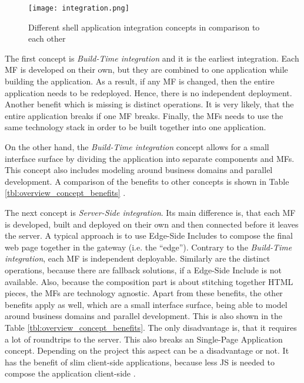 \begin{figure}[h]
    \centering
    \texttt{[image: integration.png]}
    \caption{Different shell application integration concepts in comparison to each other \cite{Leitner.2020}}
    \label{img:container_application_concepts}
\end{figure}

The first concept is \textit{Build-Time integration} and it is the earliest integration.
Each \ac{MF} is developed on their own, but they are combined to one application while building the application.
As a result, if any \ac{MF} is changed, then the entire application needs to be redeployed.
Hence, there is no independent deployment.
Another benefit which is missing is distinct operations.
It is very likely, that the entire application breaks if one \ac{MF} breaks.
Finally, the \acp{MF} needs to use the same technology stack in order to be built together into one application.

On the other hand, the \textit{Build-Time integration} concept allows for a small interface surface by dividing the application into separate components and \acp{MF}.
This concept also includes modeling around business domains and parallel development.
A comparison of the benefits to other concepts is shown in Table \ref{tbl:overview_concept_benefits} \cite{Leitner.2020}.

The next concept is \textit{Server-Side integration}.
Its main difference is, that each \ac{MF} is developed, built and deployed on their own and then connected before it leaves the server.
A typical approach is to use Edge-Side Includes to compose the final web page together in the gateway (i.e. the \enquote{edge}).
Contrary to the \textit{Build-Time integration}, each \ac{MF} is independent deployable.
Similarly are the distinct operations, because there are fallback solutions, if a Edge-Side Include is not available.
Also, because the composition part is about stitching together \ac{HTML} pieces, the \acp{MF} are technology agnostic.
Apart from these benefits, the other benefits apply as well, which are a small interface surface, being able to model around business domains and parallel development.
This is also shown in the Table \ref{tbl:overview_concept_benefits}.
The only disadvantage is, that it requires a lot of roundtrips to the server.
This also breaks an Single-Page Application concept.
Depending on the project this aspect can be a disadvantage or not.
It has the benefit of slim client-side applications, because less \ac{JS} is needed to compose the application client-side \cite{Leitner.2020}.

